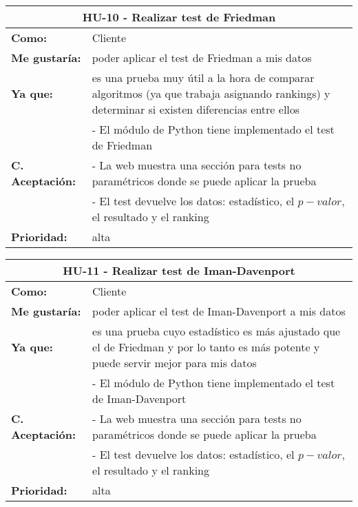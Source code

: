 
\begin{table}[H]
	\begin{tabular}{| p{3cm}| p{12cm} |}
		\hline
		\multicolumn{2}{|c|}{\textbf{HU-10} - Realizar test de Friedman} \\ \hline
		\textbf{Como:} & Cliente \\ \hline
		\textbf{Me gustaría:} & poder aplicar el test de Friedman a mis datos \\ \hline
		\textbf{Ya que:} & es una prueba muy útil a la hora de comparar algoritmos (ya que trabaja asignando rankings) y determinar si existen diferencias entre ellos \\ \hline
		\multirow{3}{12cm}{\textbf{C. Aceptación:}} & - El módulo de Python tiene implementado el test de Friedman \\
		& - La web muestra una sección para tests no paramétricos donde se puede aplicar la prueba \\
		& - El test devuelve los datos: estadístico, el $p-valor$, el resultado y el ranking \\ \hline
		\textbf{\textbf{Prioridad:}} & alta \\ \hline
	\end{tabular}
\end{table}


\begin{table}[H]
	\begin{tabular}{| p{3cm}| p{12cm} |}
		\hline
		\multicolumn{2}{|c|}{\textbf{HU-11} - Realizar test de Iman-Davenport} \\ \hline
		\textbf{Como:} & Cliente \\ \hline
		\textbf{Me gustaría:} & poder aplicar el test de Iman-Davenport a mis datos \\ \hline
		\textbf{Ya que:} & es una prueba cuyo estadístico es más ajustado que el de Friedman y por lo tanto es más potente y puede servir mejor para mis datos \\ \hline
		\multirow{3}{12cm}{\textbf{C. Aceptación:}} & - El módulo de Python tiene implementado el test de Iman-Davenport \\
		& - La web muestra una sección para tests no paramétricos donde se puede aplicar la prueba \\
		& - El test devuelve los datos: estadístico, el $p-valor$, el resultado y el ranking \\ \hline
		\textbf{\textbf{Prioridad:}} & alta \\ \hline
	\end{tabular}
\end{table}

